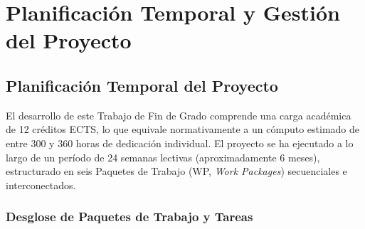 
\chapter{Planificación Temporal y Gestión del Proyecto}
\label{cap:planificacion}

\section{Planificación Temporal del Proyecto}
\label{sec:plan_temporal}

El desarrollo de este Trabajo de Fin de Grado comprende una carga académica de 12 créditos ECTS, lo que equivale normativamente a un cómputo estimado de entre 300 y 360 horas de dedicación individual. El proyecto se ha ejecutado a lo largo de un período de 24 semanas lectivas (aproximadamente 6 meses), estructurado en seis Paquetes de Trabajo (WP, \textit{Work Packages}) secuenciales e interconectados.

\subsection{Desglose de Paquetes de Trabajo y Tareas}

